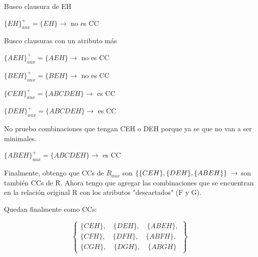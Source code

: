 \documentclass[a4paper,12pt]{article}
\begin{document}
\begin{enumerate}[label=\textbf{\arabic*.}]
    Busco clausura de EH

    \vspace{0.1cm}

    $\{EH\}^{+}_{aux} = \{EH\} \rightarrow$ no es CC

    \vspace{0.1cm}

    Busco clausuras con un atributo más

    $\{AEH\}^{+}_{aux} = \{AEH\} \rightarrow$ no es CC

    \vspace{0.1cm}

    $\{BEH\}^{+}_{aux} = \{BEH\} \rightarrow$ no es CC

    \vspace{0.1cm}

    $\{CEH\}^{+}_{aux} = \{ABCDEH\} \rightarrow$ es CC

    \vspace{0.1cm}

    $\{DEH\}^{+}_{aux} = \{ABCDEH\} \rightarrow$ es CC

    \vspace{0.1cm}

    No pruebo combinaciones que tengan CEH o DEH porque ya se que no van a ser minimales.

    \vspace{0.1cm}

    $\{ABEH\}^{+}_{aux} = \{ABCDEH\} \rightarrow$ es CC

    \vspace{0.1cm}

    Finalmente, obtengo que CCs de $R_{aux}$ son $\{\{CEH\},  \{DEH\}, \{ABEH\}\} \hspace{0.1cm} \rightarrow$ son también CCs de R. Ahora tengo que agregar las combinaciones que se encuentran en la relación original R con los atributos "descartados" \hspace{0.1cm} (F y G).

    Quedan finalmente como CCs:

    \vspace{0.1cm}

    \[
    \left\{
    \begin{array}{l}
    \{CEH\},\quad \{DEH\},\quad \{ABEH\}, \\
    \{CFH\},\quad \{DFH\},\quad \{ABFH\}, \\
    \{CGH\},\quad \{DGH\},\quad \{ABGH\}
    \end{array}
    \right\}
    \]


\end{enumerate}
\end{document}
